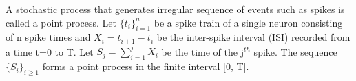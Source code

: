 A stochastic process that generates irregular sequence of events such as spikes is called a point process. Let $\{t_{i} \}_{i=1}^{n}$ be a spike train of a single neuron consisting of
n spike times and $X_{i} = t_{i+1} - t_{i}$ be the inter-spike interval (ISI) recorded from
a time t=0 to T. Let $S_{j} = \sum_{i=1}^{j}X_{i}$ be the time of the j$^{th}$ spike.
The sequence $\{ S_{i} \}_{i \geq 1}$ forms a point process in the finite interval [0, T].
































































